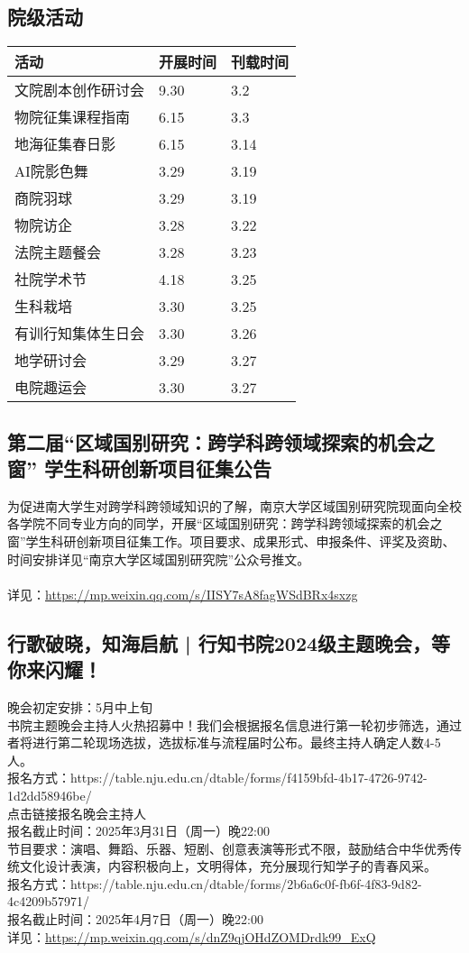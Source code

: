 \documentclass[letterpaper, 12pt]{article}
\begin{document}
\begin{multicols}{2}
\section{院级活动}
\begin{tabular}{|>{\centering\arraybackslash}m{}|m{}|m{}|}
\hline
    活动 & 开展时间 & 刊载时间\\
    \hline\hline
    文院剧本创作研讨会 & 9.30 & 3.2\\
    物院征集课程指南 & 6.15 & 3.3\\
    地海征集春日影 & 6.15 & 3.14\\
    AI院影色舞 & 3.29 & 3.19\\
    商院羽球 & 3.29 & 3.19\\
    物院访企 & 3.28 & 3.22\\
    法院主题餐会 & 3.28 & 3.23\\
    社院学术节 & 4.18 & 3.25\\
    生科栽培 & 3.30 & 3.25\\
    有训行知集体生日会 & 3.30 & 3.26\\
    地学研讨会 & 3.29 & 3.27\\
    电院趣运会 & 3.30 & 3.27\\
    \hline
\end{tabular}

\subsection{第二届“区域国别研究：跨学科跨领域探索的机会之窗”  学生科研创新项目征集公告}
为促进南大学生对跨学科跨领域知识的了解，南京大学区域国别研究院现面向全校各学院不同专业方向的同学，开展“区域国别研究：跨学科跨领域探索的机会之窗”学生科研创新项目征集工作。项目要求、成果形式、申报条件、评奖及资助、时间安排详见“南京大学区域国别研究院”公众号推文。
\\
\\详见：\url{https://mp.weixin.qq.com/s/IISY7sA8fagWSdBRx4sxzg}


\subsection{行歌破晓，知海启航 | 行知书院2024级主题晚会，等你来闪耀！}
晚会初定安排：5月中上旬
\\书院主题晚会主持人火热招募中！我们会根据报名信息进行第一轮初步筛选，通过者将进行第二轮现场选拔，选拔标准与流程届时公布。最终主持人确定人数4-5人。
\\报名方式：https://table.nju.edu.cn/dtable/forms/f4159bfd-4b17-4726-9742-1d2dd58946be/
\\点击链接报名晚会主持人
\\报名截止时间：2025年3月31日（周一）晚22:00
\\节目要求：演唱、舞蹈、乐器、短剧、创意表演等形式不限，鼓励结合中华优秀传统文化设计表演，内容积极向上，文明得体，充分展现行知学子的青春风采。
\\报名方式：https://table.nju.edu.cn/dtable/forms/2b6a6c0f-fb6f-4f83-9d82-4c4209b57971/
\\报名截止时间：2025年4月7日（周一）晚22:00
\\详见：\url{https://mp.weixin.qq.com/s/dnZ9qjOHdZOMDrdk99_ExQ}


\end{multicols}
\end{document}
